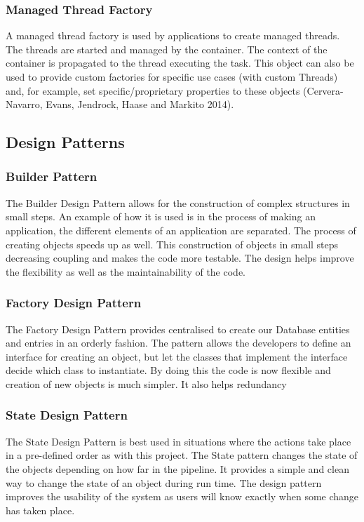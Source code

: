 \documentclass[12pt]{article}
\begin{document}
\subsubsection{Managed Thread Factory}
A managed thread factory is used by applications to create managed threads. The threads are started and managed by the container. The context of the container is propagated to the thread executing the task. This object can also be used to provide custom factories for specific use cases (with custom Threads) and, for example, set specific/proprietary properties to these objects (Cervera-Navarro, Evans, Jendrock, Haase and Markito 2014).

\subsection{Design Patterns}
\subsubsection{Builder Pattern}
The Builder Design Pattern allows for the construction of complex structures in small steps. An example of how it is used is in the process of making an application, the different elements of an application are separated. The process of creating objects speeds up as well. This construction of objects in small steps decreasing coupling and makes the code more testable. The design helps improve the flexibility as well as the maintainability of the code.  

\subsubsection{Factory Design Pattern}
The Factory Design Pattern provides centralised to create our Database entities and entries in an orderly fashion. The pattern allows the developers to define an interface for creating an object, but let the classes that implement the interface decide which class to instantiate. By doing this the code is now flexible and creation of new objects is much simpler. It also helps redundancy 

\subsubsection{State Design Pattern}
The State Design Pattern is best used in situations where the actions take place in a pre-defined order as with this project. The State pattern changes the state of the objects depending on how far in the pipeline. It provides a simple and clean way to change the state of an object during run time. The design pattern improves the usability of the system as users will know exactly when some change has taken place. 
\end{document}
